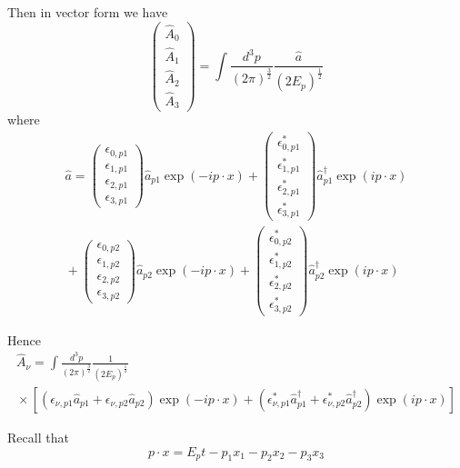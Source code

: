 Then in vector form we have
\begin{equation*}
\begin{pmatrix}\hat A_0\\\hat A_1\\\hat A_2\\\hat A_3\end{pmatrix}
=\int\frac{d^3p}{(2\pi)^\frac{3}{2}}\frac{\hat a}{(2E_p)^\frac{1}{2}}
\end{equation*}
where
\begin{multline*}
\hat a=\begin{pmatrix}\epsilon_{0,p1}\\\epsilon_{1,p1}\\\epsilon_{2,p1}\\\epsilon_{3,p1}\end{pmatrix}
\hat a_{p1}\exp(-ip\cdot x)
+\begin{pmatrix}\epsilon_{0,p1}^*\\\epsilon_{1,p1}^*\\\epsilon_{2,p1}^*\\\epsilon_{3,p1}^*\end{pmatrix}
\hat a_{p1}^\dag\exp(ip\cdot x)
\\
{}+\begin{pmatrix}\epsilon_{0,p2}\\\epsilon_{1,p2}\\\epsilon_{2,p2}\\\epsilon_{3,p2}\end{pmatrix}
\hat a_{p2}\exp(-ip\cdot x)
+\begin{pmatrix}\epsilon_{0,p2}^*\\\epsilon_{1,p2}^*\\\epsilon_{2,p2}^*\\\epsilon_{3,p2}^*\end{pmatrix}
\hat a_{p2}^\dag\exp(ip\cdot x)
\end{multline*}

Hence
\begin{multline*}
\hat A_\nu=\int\frac{d^3p}{(2\pi)^\frac{3}{2}}\frac{1}{(2E_p)^\frac{1}{2}}
\\
{}\times
\left[
(\epsilon_{\nu,p1}\hat a_{p1}+\epsilon_{\nu,p2}\hat a_{p2})\exp(-ip\cdot x)
+(\epsilon_{\nu,p1}^*\hat a_{p1}^\dag+\epsilon_{\nu,p2}^*\hat a_{p2}^\dag)\exp(ip\cdot x)
\right]
\end{multline*}

Recall that
\begin{equation*}
p\cdot x=E_pt-p_1x_1-p_2x_2-p_3x_3
\end{equation*}

